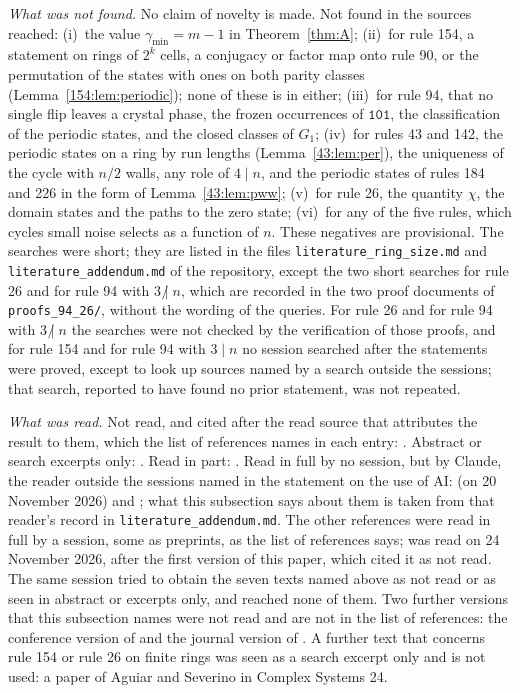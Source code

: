 \documentclass[10pt,a4paper]{article}
\newcommand{\gmin}{\gamma_{\min}}
\newcommand{\Gone}{G_1}                       %
\newcommand{\code}[1]{\mathtt{#1}}            %
\newcommand{\ndiv}{\mathrel{\not|}}           %
\begin{document}
\emph{What was not found.}
No claim of novelty is made. Not found in the sources reached:
(i)~the value $\gmin=m-1$ in Theorem~\ref{thm:A};
(ii)~for rule 154, a statement on rings of $2^k$ cells, a conjugacy or factor map onto rule 90, or the permutation
of the states with ones on both parity classes (Lemma~\ref{154:lem:periodic}); none of these is in
\cite{ZhuRichard2026} either;
(iii)~for rule 94, that no single flip leaves a crystal phase, the frozen occurrences of $\code{101}$, the
classification of the periodic states, and the closed classes of $\Gone$;
(iv)~for rules 43 and 142, the periodic states on a ring by run lengths (Lemma~\ref{43:lem:per}), the uniqueness of
the cycle with $n/2$ walls, any role of $4\mid n$, and the periodic states of rules 184 and 226 in the form of
Lemma~\ref{43:lem:pww};
(v)~for rule 26, the quantity $\chi$, the domain states and the paths to the zero state;
(vi)~for any of the five rules, which cycles small noise selects as a function of $n$.
These negatives are provisional. The searches were short; they are listed in the files
\texttt{literature\_ring\_size.md} and \texttt{literature\_addendum.md} of the repository, except the two short
searches for rule 26 and for rule 94 with $3\ndiv n$, which are recorded in the two proof documents of
\texttt{proofs\_94\_26/}, without the wording of the queries. For rule 26 and for rule
94 with $3\ndiv n$ the searches were not checked by the verification of those proofs, and for rule 154 and for rule
94 with $3\mid n$ no session searched after the statements were proved, except to look up sources named by a search
outside the sessions; that search, reported to have found no prior statement, was not repeated.

\emph{What was read.}
Not read, and cited after the read source that attributes the result to them, which the list of references names in
each entry:
\cite{Boccara1993,NoldekeSamuelson1993,FreidlinWentzell1984,HattoriTakesue1991}.
Abstract or search excerpts only: \cite{Samuelson1994,NobeYura2004,NobeYura2007}. Read in part:
\cite{Ellison2000,BhattacharjeeDas2019,Nordahl1989,Stricker2023,Wolfram2002}. Read in full by no session, but by Claude, the
reader outside the sessions named in the statement on the use of AI: \cite{ZhuRichard2026} (on 20 November 2026) and
\cite{Fuks2005b}; what this subsection says about them is taken from that reader's record in
\texttt{literature\_addendum.md}. The other references were read in full by a session, some as preprints, as the
list of references says; \cite{Young1993} was read on 24 November 2026, after the first version of this paper, which
cited it as not read. The same session tried to obtain the seven texts named above as not read or as seen in
abstract or excerpts only, and reached none of them. Two further versions that this subsection names were not read and are not in the list of
references: the conference version of \cite{BagnoliBaiaMatteuzzi2025} and the journal version of \cite{Fuks2005b}.
A further text that concerns rule 154 or rule 26 on finite rings was seen as a search excerpt only and is not used:
a paper of Aguiar and Severino in Complex Systems 24.
\end{document}
